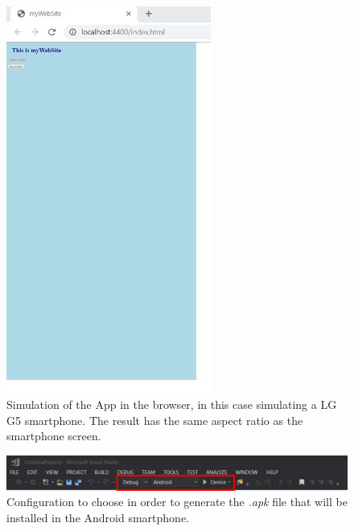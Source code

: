 \begin{figure}
    \centering
    \includegraphics[width= 0.6\textwidth]{Figures/Cordova6}
    \caption{Simulation of the App in the browser, in this case simulating a LG G5 smartphone. The result has the same aspect ratio as the smartphone screen.}
    \label{fig:Cordova6}
\end{figure}

\begin{figure}
    \centering
    \includegraphics[width= \textwidth]{Figures/Cordova7}
    \caption{Configuration to choose in order to generate the \textit{.apk} file that will be installed in the Android smartphone.}
    \label{fig:Cordova7}
\end{figure}

